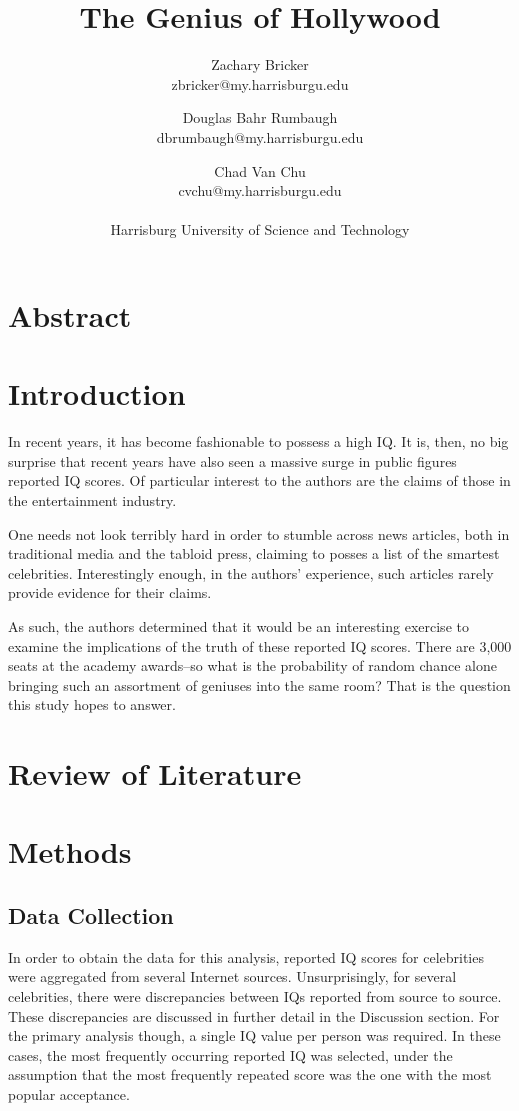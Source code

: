 \documentclass[12pt,letterpaper,titlepage,oneside,draft]{article}
\title{The Genius of Hollywood}
\author{
	Zachary Bricker  \\
	zbricker@my.harrisburgu.edu
	\and
	Douglas Bahr Rumbaugh \\
	dbrumbaugh@my.harrisburgu.edu
	\and 
	Chad Van Chu \\
	cvchu@my.harrisburgu.edu
	\\
	\\
	Harrisburg University of Science and Technology
}
\date{}
\begin{document}
\maketitle
\section*{Abstract}
\tableofcontents
\pagebreak


\section{Introduction}
In recent years, it has become fashionable to possess a high IQ. It is, then, no big surprise that recent years have also seen a massive surge in public figures reported IQ scores. Of particular interest to the authors are the claims of those in the entertainment industry.

One needs not look terribly hard in order to stumble across news articles, both in traditional media and the tabloid press, claiming to posses a list of the smartest celebrities. Interestingly enough, in the authors' experience, such articles rarely provide evidence for their claims.

As such, the authors determined that it would be an interesting exercise to examine the implications of the truth of these reported IQ scores. There are 3,000 seats at the academy awards--so what is the probability of random chance alone bringing such an assortment of geniuses into the same room? That is the question this study hopes to answer.
\section{Review of Literature}

\section{Methods}

\subsection{Data Collection}
In order to obtain the data for this analysis, reported IQ scores for celebrities were aggregated from several Internet sources. Unsurprisingly, for several celebrities, there were discrepancies between IQs reported from source to source. These discrepancies are discussed in further detail in the Discussion section. For the primary analysis though, a single IQ value per person was required. In these cases, the most frequently occurring reported IQ was selected, under the assumption that the most frequently repeated score was the one with the most popular acceptance.
\end{document}
